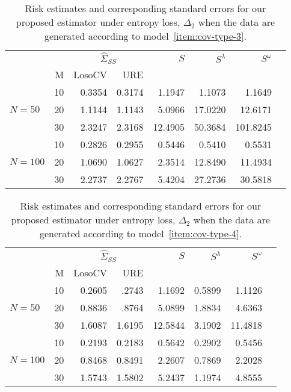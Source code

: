 \documentclass[12pt]{article}
\theoremstyle{definition}
\begin{document}

\begin{table}[H] \label{table:simulation-1-entropy-loss-sigma-3}
\centering
\caption{Risk estimates and corresponding standard errors for our proposed estimator under entropy loss, $\Delta_2$ when the data are generated according to model~\ref{item:cov-type-3}.} 
\begin{tabular}{l|r|rrrrrr}
&  & \multicolumn{2}{c}{$\hat{\Sigma}_{SS}$} & $S$ & $S^\lambda$ & $S^\omega$ \\ 
&M & \mbox{LosoCV} & \mbox{URE} &  \\  
&    10 & 0.3354 &	0.3174	&  1.1947  & 1.1073 & 1.1649\\ 
$N = 50$ &    20 & 1.1144 &	1.1143	&  5.0966&17.0220 & 12.6171 \\ 
  &    30 & 2.3247 & 	2.3168	&  12.4905 & 50.3684 & 101.8245\\ 
   \hdashline
    &    10 & 0.2826 & 0.2955  & 0.5446& 0.5410 & 0.5531  \\ 
  $N = 100$ &    20 & 1.0690 &  1.0627 & 2.3514 & 12.8490 & 11.4934\\ 
   &    30 & 2.2737 & 2.2767 & 5.4204& 27.2736 & 30.5818  \\ 
\end{tabular}
\end{table}

\begin{table}[H] \label{table:simulation-1-entropy-loss-sigma-4}
\centering
\caption{Risk estimates and corresponding standard errors for our proposed estimator under entropy loss, $\Delta_2$ when the data are generated according to model~\ref{item:cov-type-4}.} \begin{tabular}{l|r|rrrrrr}
&  & \multicolumn{2}{c}{$\hat{\Sigma}_{SS}$} & $S$ & $S^\lambda$ & $S^\omega$ \\ 
&M & \mbox{LosoCV} & \mbox{URE} &  \\ 
  \hline
&    10 & 0.2605 & .2743&  1.1692 & 0.5899 & 1.1126 \\ 
$N = 50$ &    20 & 0.8836 & .8764 & 5.0899 & 1.8834 & 4.6363 \\ 
   &    30 & 1.6087 & 1.6195 &12.5844&3.1902 & 11.4818 \\ \hdashline
 &    10 & 0.2193 & 0.2183 & 0.5642 & 0.2902 & 0.5456 \\ 
  $N = 100$ &    20 & 0.8468 & 0.8491 & 2.2607 & 0.7869 & 2.2028\\ 
   &    30 & 1.5743 & 1.5802 & 5.2437 & 1.1974 & 4.8555 \\
  \end{tabular}
\end{table}
\end{document}
